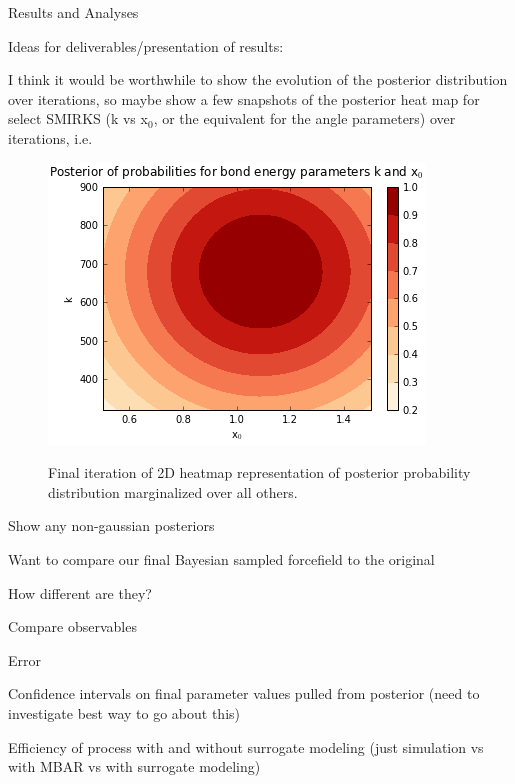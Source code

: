 \documentclass{report}
\begin{document}
\begin{outline}
\begin{outline}
  \item{Results and Analyses}
  \begin{outline}
    \item{Ideas for deliverables/presentation of results:}
    \begin{outline}
      \item{I think it would be worthwhile to show the evolution of the posterior distribution over iterations, so maybe show a few snapshots of 
                the posterior heat map for select SMIRKS (k vs x$_0$, or the equivalent for the angle parameters) over iterations, i.e.  
      \begin{figure}[h!]
      \centering
  
      \includegraphics[width=.9\linewidth]{fake_post.PNG}
      \label{fig:sub1}
      \caption{Final iteration of 2D heatmap representation of posterior probability distribution marginalized over all others.}
      \end{figure}
      \item{Show any non-gaussian posteriors}
      \item{Want to compare our final Bayesian sampled forcefield to the original}
      \begin{outline}
        \item{How different are they?}
        \item{Compare observables}
        \item{Error}
        \item{Confidence intervals on final parameter values pulled from posterior (need to investigate best way to go about this)}
      \end{outline}
      \item{Efficiency of process with and without surrogate modeling (just simulation vs with MBAR vs with surrogate modeling)}
}
\end{outline}
\end{outline}
\end{outline}
\end{outline}
\end{document}
